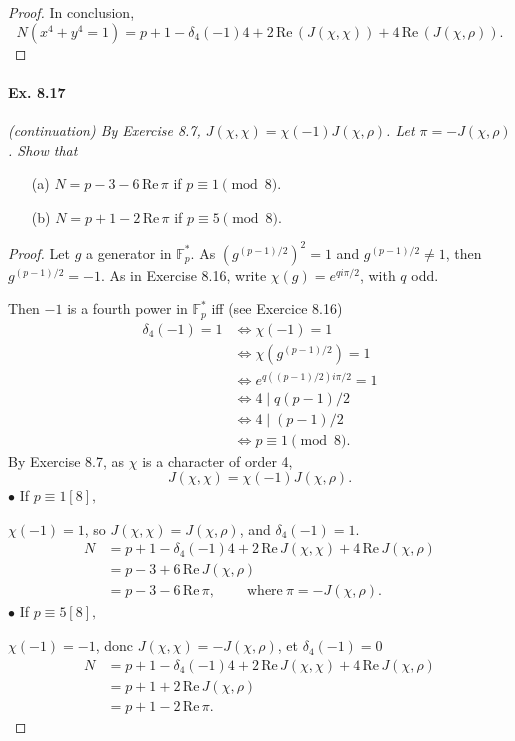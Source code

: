 \documentclass[11pt,a4paper]{article}
\newcommand{\F}{\mathbb{F}}
\newcommand{\re}{\,\mathrm{Re}\,}
\begin{document}
{\begin{proof}
In conclusion,
 $$N(x^4+y^4=1) = p+1- \delta_4(-1)4+ 2 \,\mathrm{Re}\,( J (\chi,\chi))+4\,\mathrm{Re}\,(J(\chi,\rho)).$$
\end{proof}

\paragraph{Ex. 8.17}

{\it (continuation) By Exercise 8.7, $J(\chi,\chi) = \chi(-1) J(\chi,\rho)$. Let $\pi = -J(\chi,\rho)$. Show that
\begin{enumerate}
\item[(a)] $N = p-3 - 6\,\mathrm{Re}\, \pi$ if $p\equiv 1 \pmod 8$.
\item[(b)] $N = p+1 - 2 \,\mathrm{Re}\,  \pi$ if $p \equiv 5 \pmod 8$.
\end{enumerate}
}

\begin{proof}
Let $g$ a generator in  $\mathbb{F}_p^*$. As $(g^{(p-1)/2})^2=1$ and $g^{(p-1)/2} \neq 1$, then $g^{(p-1)/2} = -1$.
As in Exercise 8.16, write $\chi(g) = e^{q i\pi/2}$, with $q$ odd.

Then $-1$ is a fourth power in $\F_p^*$ iff (see Exercice 8.16)
\begin{align*}
\delta_4(-1) = 1 &\iff \chi(-1)=1\\
&\iff \chi(g^{(p-1)/2}) = 1\\
&\iff e^{q ((p-1)/2 )i\pi/2} = 1\\
&\iff  4 \mid q(p-1)/2\\
&\iff 4 \mid (p-1)/2\\
&\iff p\equiv 1 \pmod 8.
\end{align*}
By Exercise 8.7, as $\chi$ is a character of order 4,
$$J(\chi,\chi) = \chi(-1) J(\chi,\rho).$$
$\bullet$ If $p\equiv 1 [8],$

$\chi(-1) = 1$, so $J(\chi,\chi) = J(\chi,\rho)$, and $\delta_4(-1) = 1$.
\begin{align*}
N &= p+1 - \delta_4(-1) 4 + 2 \re J(\chi,\chi)  + 4 \re J(\chi,\rho)\\
&=p-3+6 \re J(\chi,\rho)\\
 &= p-3-6\re \pi,\qquad  \ \mathrm{where}\ \pi = -J(\chi,\rho).
\end{align*}
$\bullet$ If $p\equiv 5 [8],$

$\chi(-1) = -1$, donc $J(\chi,\chi) = -J(\chi,\rho)$, et $\delta_4(-1) = 0$
\begin{align*}
N &= p+1 - \delta_4(-1) 4 + 2 \re J(\chi,\chi)  + 4 \re J(\chi,\rho)\\
&= p+1 + 2 \re J(\chi,\rho)\\
 &= p+1 - 2 \re \pi.
\end{align*}
\end{proof}

}
\end{document}
